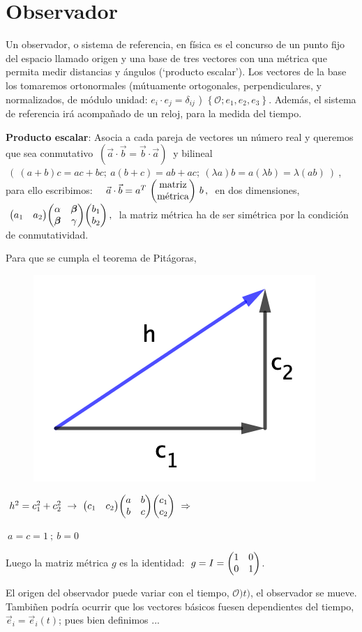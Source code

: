 \section{Observador}

Un observador, o sistema de referencia, en física es el concurso de un punto fijo del espacio llamado origen y una base de tres vectores con una métrica que permita medir distancias y ángulos (`producto escalar'). Los vectores de la base los tomaremos ortonormales (mútuamente ortogonales, perpendiculares, y normalizados, de módulo unidad: $e_i \cdot e_j=\delta_{ij}$ ) $\left\{ \mathcal O; e_1, e_2, e_3 \right\}.$ Además, el sistema de referencia irá acompañado de un reloj, para la medida del tiempo.

\textbf{Producto escalar}: Asocia a cada pareja de vectores un número real y queremos que sea conmutativo $\ (\vec a \cdot \vec b=\vec b \cdot \vec a) \ $ y bilineal $\ ( \ (a+b)c=ac+bc;\ a(b+c)=ab+ac;\ (\lambda a)b=a(\lambda b)=\lambda(ab) \  )\ $, para ello escribimos:
$\quad \vec a \cdot \vec b=a^T \ \mqty(\text{matriz}\\ \text{métrica}) \ b \, , \ $ en dos dimensiones, $\ \mqty(a_1&a_2) \mqty(\alpha& \boldsymbol{\beta}\\ \boldsymbol{\beta} &\gamma) \mqty(b_1\\b_2)\, , \ $ la matriz métrica ha de ser simétrica por la condición de conmutatividad.

Para que se cumpla el teorema de Pitágoras,
\begin{multicols}{2}
\begin{figure}[H]
	\centering
	\includegraphics[width=.20\textwidth]{imagenes/img30-03.png}
\end{figure}

$\ h^2=c_1^2+c_2^2 \ \to  \ \mqty(c_1&c_2) \mqty(a&b\\b&c) \mqty(c_1\\c_2) \ \Rightarrow $

$\ a=c=1 \ ; \ b=0$ 
\end{multicols}
Luego la matriz métrica $g$ es la identidad: $\ g=I=\mqty(1&0\\0&1)$.

El origen del observador puede variar con el tiempo, $\mathcal O)t)$, el observador se mueve. Tambiñen podría ocurrir que los vectores básicos fuesen dependientes del tiempo, $\vec e_i=\vec e_i(t)$; pues bien definimos ...

